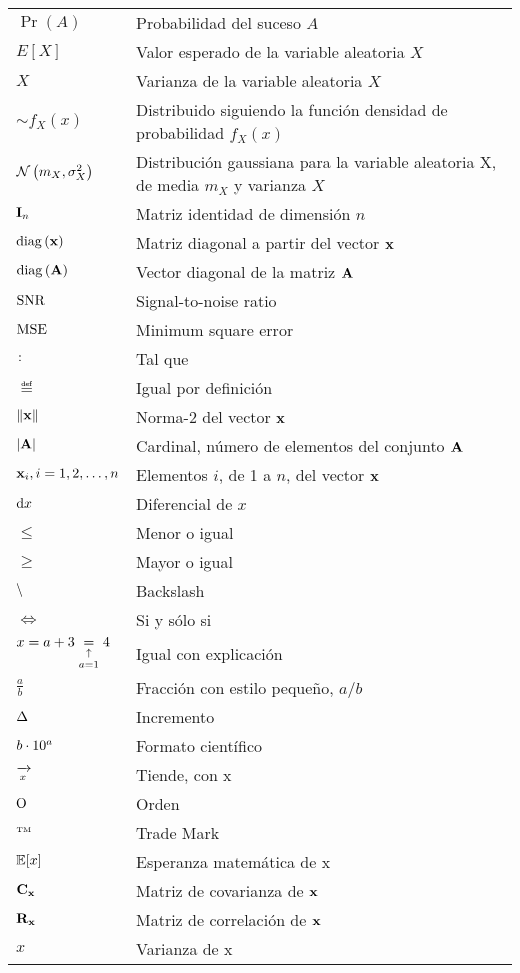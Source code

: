 \begin{longtable}{p{3cm}p{8.5cm}}
%
$\Pr\left( {A} \right)$ & Probabilidad del suceso $A$ \\
$\displaystyle E\left[ {X} \right]$ & Valor esperado de la variable aleatoria $X$ \\
$\si{X}$ & Varianza de la variable aleatoria $X$\\
$\sim f_{X}\left( {x} \right)$ & Distribuido siguiendo la función densidad de probabilidad $f_{X}\left( {x} \right)$\\
%
$\mathcal{N}\left( {m_{X}, \sigma_{X}^{2}} \right)$ &Distribución gaussiana para la variable aleatoria X, de media $m_{X}$ y varianza $\si{X}$ \\
$\mathbf{I}_{n}$ & Matriz identidad de dimensión $n$\\
$\mathrm{diag}\left(\mathbf{x}\right)$ & Matriz diagonal a partir del vector $\mathbf{x}$\\
$\mathrm{diag}\left(\mathbf{A}\right)$ & Vector diagonal de la matriz $\mathbf{A}$\\
$\mathrm{SNR}$& Signal-to-noise ratio \\
$\mathrm{MSE}$ & Minimum square error\\
$\colon$ & Tal que \\
$\eqdef$ & Igual por definición \\
$\left\lVert \mathbf{x} \right\rVert $ & Norma-2 del vector $\mathbf{x}$\\
$\left| \mathbf{{A}}\right|$ & Cardinal, número de elementos del conjunto $\mathbf{A}$\\
$\mathbf{x}_{i},i=1,2,\ldots,n$ & Elementos $i$, de 1 a $n$, del vector $\mathbf{x}$\\
$\mathrm{d}{x}$& Diferencial de $x$\\
$\le$ & Menor o igual \\
$\ge$ & Mayor o igual \\
$\backslash$ & Backslash \\
$\iff$ & Si y sólo si \\
$x=a+3\underset{a=1}{\underset{\uparrow}{=}} 4 $& Igual con explicación \\
$\tfrac{a}{b}$ & Fracción con estilo pequeño, $a/b$ \\
$\Delta$ & Incremento \\
$b\cdot 10^{a}$ & Formato científico \\
$\xrightarrow[x]{}$ & Tiende, con x \\
$\mathrm{O}$ & Orden\\
$^{\text{\tiny{TM}}}$ & Trade Mark\\
$\mathbb{E}[x]$ & Esperanza matemática de x\\
$\mathbf{C}_{\mathbf{x}}$ & Matriz de covarianza de $\mathbf{x}$\\
$\mathbf{R}_{\mathbf{x}}$ & Matriz de correlación de $\mathbf{x}$\\
$\si{x}$ & Varianza de x \\


\end{longtable}
